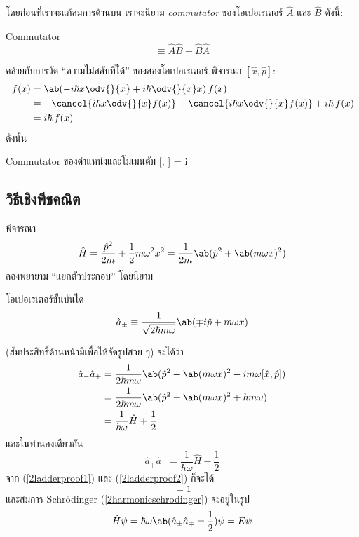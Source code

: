 โดยก่อนที่เราจะแก้สมการด้านบน เราจะนิยาม \emph{commutator} ของโอเปอเรเตอร์ $\hat{A}$ และ $\hat{B}$ ดังนี้:
\begin{defbox}{ Commutator}
    \begin{equation}
        [\hat{A}, \hat{B}] \equiv \hat{A}\hat{B} - \hat{B}\hat{A}
    \end{equation}
\end{defbox}
คล้ายกับการวัด ``ความไม่สลับที่ไ้ด้'' ของสองโอเปอเรเตอร์ พิจารณา $[\hat{x}, \hat{p}]$:
\begin{align*}
    [\hat{x}, \hat{p}]\,f(x) &= \ab(-i\hbar x\odv{}{x} + i\hbar\odv{}{x}x)\,f(x)\\
    &= -\cancel{i\hbar x\odv{}{x}f(x)} + \cancel{i\hbar x\odv{}{x}f(x)} + i\hbar \,f(x)\\
    &= i\hbar\,f(x)
\end{align*}
ดังนั้น
\begin{eqbox}{Commutator ของตำแหน่งและโมเมนตัม}
    [, ] = i\hbar
\end{eqbox}

\subsection{วิธีเชิงพีชคณิต}

พิจารณา
\[
\hat{H} = \frac{\hat{p}^2}{2m} + \frac{1}{2}m\omega^2x^2 = \frac{1}{2m}\ab(\hat{p}^2 + \ab(m\omega x)^2)
\]
ลองพยายาม ``แยกตัวประกอบ'' โดยนิยาม
\begin{defbox}{โอเปอเรเตอร์ขั้นบันได}
    \begin{equation}
        \hat{a}_\pm \equiv \frac{1}{\sqrt{2\hbar m\omega}}\ab(\mp i\hat{p} + m\omega x)
    \end{equation}
\end{defbox}
(สัมประสิทธิ์ด้านหน้ามีเพื่อให้จัดรูปสวย ๆ) จะได้ว่า
\begin{align}
    \hat{a}_-\hat{a}_+ &= \frac{1}{2\hbar m\omega}\ab(\hat{p}^2 + \ab(m\omega x)^2 -im\omega[\hat{x}, \hat{p}])\notag\\
    &= \frac{1}{2\hbar m\omega}\ab(\hat{p}^2 + \ab(m\omega x)^2 +\hbar m\omega)\notag\\
    &= \frac{1}{\hbar\omega}\hat{H} + \frac{1}{2}\label{2ladderproof1}
\end{align}
และในทำนองเดียวกัน
\begin{equation}
    \hat{a}_+\hat{a}_- = \frac{1}{\hbar\omega}\hat{H} - \frac{1}{2}\label{2ladderproof2}
\end{equation}
จาก (\ref{2ladderproof1}) และ (\ref{2ladderproof2}) ก็จะได้
\begin{equation}
    [\hat{a}_-, \hat{a}_+] = 1
\end{equation}
และสมการ Schrödinger (\ref{2harmonicschrodinger}) จะอยู่ในรูป
\begin{equation}
    \hat{H}\psi = \hbar\omega\ab(\hat{a}_\pm\hat{a}_\mp \pm \frac{1}{2})\psi = E\psi
\end{equation}

